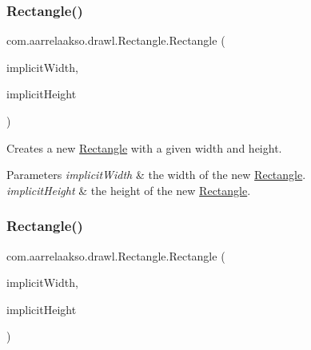 \subsubsection{\texorpdfstring{Rectangle()}{Rectangle()}\hspace{0.1cm}{\footnotesize\ttfamily [3/4]}}
{\footnotesize\ttfamily com.\+aarrelaakso.\+drawl.\+Rectangle.\+Rectangle (\begin{DoxyParamCaption}\item[{Integer}]{implicit\+Width,  }\item[{Integer}]{implicit\+Height }\end{DoxyParamCaption})\hspace{0.3cm}{\ttfamily [protected]}}



Creates a new \hyperlink{classcom_1_1aarrelaakso_1_1drawl_1_1_rectangle}{Rectangle} with a given width and height. 


\begin{DoxyParams}{Parameters}
{\em implicit\+Width} & the width of the new \hyperlink{classcom_1_1aarrelaakso_1_1drawl_1_1_rectangle}{Rectangle}. \\
\hline
{\em implicit\+Height} & the height of the new \hyperlink{classcom_1_1aarrelaakso_1_1drawl_1_1_rectangle}{Rectangle}. \\
\hline
\end{DoxyParams}
\mbox{\label{classcom_1_1aarrelaakso_1_1drawl_1_1_rectangle_aa5cd32bd84c1b9f0dd53757d2b4460f2}} 
\subsubsection{\texorpdfstring{Rectangle()}{Rectangle()}\hspace{0.1cm}{\footnotesize\ttfamily [4/4]}}
{\footnotesize\ttfamily com.\+aarrelaakso.\+drawl.\+Rectangle.\+Rectangle (\begin{DoxyParamCaption}\item[{\hyperlink{classcom_1_1aarrelaakso_1_1drawl_1_1_sisu_big_decimal}{Sisu\+Big\+Decimal}}]{implicit\+Width,  }\item[{\hyperlink{classcom_1_1aarrelaakso_1_1drawl_1_1_sisu_big_decimal}{Sisu\+Big\+Decimal}}]{implicit\+Height }\end{DoxyParamCaption})\hspace{0.3cm}{\ttfamily [protected]}}



